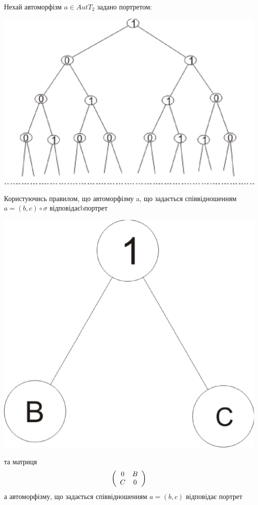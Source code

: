\documentclass[a4paper,12pt]{article} \usepackage{a4wide}
\numberwithin{equation}{subsection}
\begin{document}
Нехай автоморфізм $a\in AutT_2$ задано портретом:
\begin{center}
\includegraphics[scale=0.7]{Autfm.eps}
\end{center}
Користуючись правилом, що автоморфізму a, що задається співвідношенням $a=(b,c)\circ \sigma$
 відповідаєbпортрет
\begin{center}
\includegraphics[scale=0.3]{port1ab.eps}
\end{center}
та матриця
\[
\left( {\begin{array}{*{20}c}
   0 & B  \\
   C & 0  \\
\end{array}} \right)
\]
а автоморфізму, що задається співвідношенням $a=(b,c)$ відповідає портрет
\end{document}
